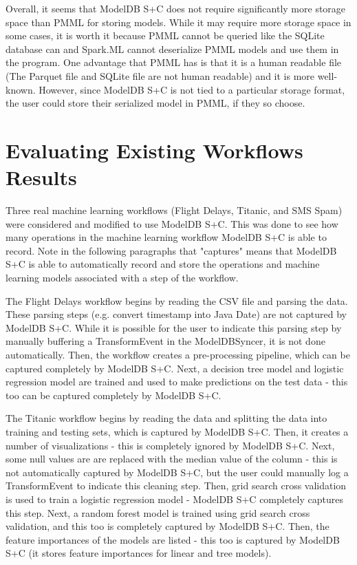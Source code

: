  Overall, it seems that ModelDB S+C does not require significantly more storage space than PMML for storing models. 
 While it may require more storage space in some cases, it is worth it because PMML cannot be queried like the SQLite
 database can and Spark.ML cannot deserialize PMML models and use them in the program. One advantage that PMML
 has is that it is a human readable file (The Parquet file and SQLite file are not human readable) and it is more well-known. 
 However, since ModelDB S+C is not tied to a particular storage format, the user could store their serialized model in PMML, 
 if they so choose.

\section{Evaluating Existing Workflows Results}
Three real machine learning workflows (Flight Delays, Titanic, and SMS Spam) were
considered and modified to use ModelDB S+C. This was done to see how many operations in the
machine learning workflow ModelDB S+C is able to record. Note in the following paragraphs that "captures"
means that ModelDB S+C is able to automatically record and store the operations and machine learning models
associated with a step of the workflow.

The Flight Delays workflow begins by reading the CSV file and parsing the data. These parsing
steps (e.g. convert timestamp into Java Date) are not captured by ModelDB S+C. While it is possible
for the user to indicate this parsing step by manually buffering a TransformEvent in the ModelDBSyncer,
it is not done automatically. Then, the workflow creates a pre-processing pipeline, which can be captured
completely by ModelDB S+C. Next, a decision tree model and logistic regression model are trained and
used to make predictions on the test data - this too can be captured completely by ModelDB S+C.

The Titanic workflow begins by reading the data and splitting the data into training and testing sets, which is captured by
ModelDB S+C. Then, it creates a number of visualizations - this is completely ignored by ModelDB S+C.
Next, some null values are are replaced with the median value of the column - this is not automatically 
captured by ModelDB S+C, but the user could manually log a TransformEvent to indicate this cleaning step.
Then, grid search cross validation is used to train a logistic regression model - ModelDB S+C completely 
captures this step. Next, a random forest model is trained using grid search cross validation, and this too
is completely captured by ModelDB S+C. Then, the feature importances of the models are listed - this too
is captured by ModelDB S+C (it stores feature importances for linear and tree models).

